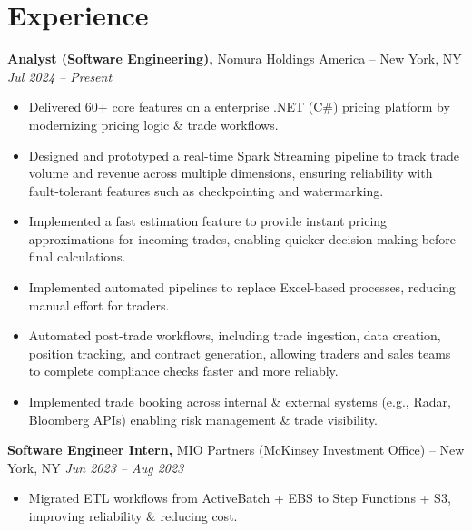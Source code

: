 \documentclass[10pt]{article}
\begin{document}
\section*{Experience}
\textbf{Analyst (Software Engineering),} Nomura Holdings America -- New York, NY \hfill \textit{Jul 2024 -- Present} \\
\vspace{0pt}
\begin{itemize}
  \item Delivered 60+ core features on a enterprise .NET (C\#) pricing platform by modernizing pricing logic \& trade workflows.
  \item Designed and prototyped a real-time Spark Streaming pipeline to track trade volume and revenue across multiple dimensions, ensuring reliability with fault-tolerant features such as checkpointing and watermarking.
  \item Implemented a fast estimation feature to provide instant pricing approximations for incoming trades, enabling quicker decision-making before final calculations.
  \item Implemented automated pipelines to replace Excel-based processes, reducing manual effort for traders.
  \item Automated post-trade workflows, including trade ingestion, data creation, position tracking, and contract generation, allowing traders and sales teams to complete compliance checks faster and more reliably.
  \item Implemented trade booking across internal \& external systems (e.g., Radar, Bloomberg APIs) enabling risk management \& trade visibility.
\end{itemize}

\textbf{Software Engineer Intern,} MIO Partners (McKinsey Investment Office) -- New York, NY \hfill \textit{Jun 2023 -- Aug 2023} \\
\vspace{0pt}
\begin{itemize}
  \item Migrated ETL workflows from ActiveBatch + EBS to Step Functions + S3, improving reliability \& reducing cost.
\end{itemize}
\end{document}
